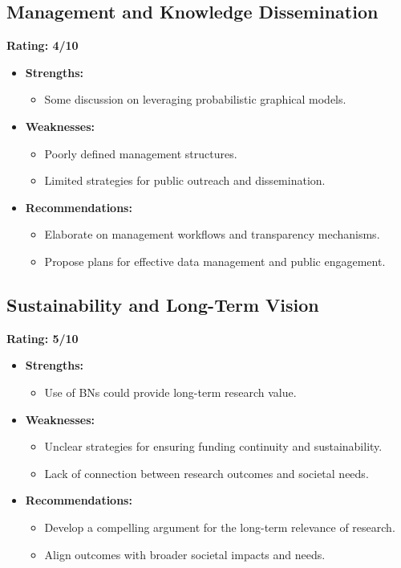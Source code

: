 \documentclass{article}
\begin{document}
\subsection{Management and Knowledge Dissemination}
\textbf{Rating: 4/10}
\begin{itemize}
    \item \textbf{Strengths:}
        \begin{itemize}
            \item Some discussion on leveraging probabilistic graphical models.
        \end{itemize}
    \item \textbf{Weaknesses:}
        \begin{itemize}
            \item Poorly defined management structures.
            \item Limited strategies for public outreach and dissemination.
        \end{itemize}
    \item \textbf{Recommendations:}
        \begin{itemize}
            \item Elaborate on management workflows and transparency mechanisms.
            \item Propose plans for effective data management and public engagement.
        \end{itemize}
\end{itemize}

\subsection{Sustainability and Long-Term Vision}
\textbf{Rating: 5/10}
\begin{itemize}
    \item \textbf{Strengths:}
        \begin{itemize}
            \item Use of BNs could provide long-term research value.
        \end{itemize}
    \item \textbf{Weaknesses:}
        \begin{itemize}
            \item Unclear strategies for ensuring funding continuity and sustainability.
            \item Lack of connection between research outcomes and societal needs.
        \end{itemize}
    \item \textbf{Recommendations:}
        \begin{itemize}
            \item Develop a compelling argument for the long-term relevance of research.
            \item Align outcomes with broader societal impacts and needs.
        \end{itemize}
\end{itemize}
\end{document}
